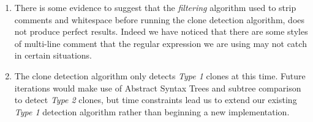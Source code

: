 \documentclass{article}
\begin{document}
\begin{enumerate}
\item There is some evidence to suggest that the \textit{filtering} algorithm used to strip comments and whitespace before running the clone detection algorithm, does not produce perfect results. Indeed we have noticed that there are some styles of multi-line comment that the regular expression we are using may not catch in certain situations.
\item The clone detection algorithm only detects \textit{Type 1} clones at this time. Future iterations would make use of Abstract Syntax Trees and subtree comparison to detect \textit{Type 2} clones, but time constraints lead us to extend our existing \textit{Type 1} detection algorithm rather than beginning a new implementation.
\end{enumerate}

\newpage

\end{document}
